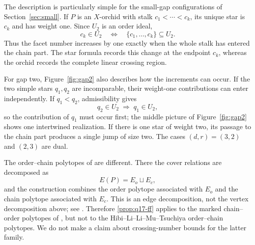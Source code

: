 \documentclass[a4paper, 11pt]{amsart}
\theoremstyle{definition}
\theoremstyle{remark}
\begin{document}
The description is particularly simple for the small-gap configurations of Section~\ref{sec:small}. If $P$ is an $X$-orchid with stalk $c_1<\cdots<c_k$, its unique star is $c_k$ and has weight one. Since $U_2$ is an order ideal,
\[
  c_k\in U_2
  \quad\Longleftrightarrow\quad
  \{c_1,\ldots,c_k\}\subseteq U_2.
\]
Thus the facet number increases by one exactly when the whole stalk has entered the chain part. The star formula records this change at the endpoint $c_k$, whereas the orchid records the complete linear crossing region.

For gap two, Figure~\ref{fig:gap2} also describes how the increments can occur. If the two simple stars $q_1,q_2$ are incomparable, their weight-one contributions can enter independently. If $q_1<q_2$, admissibility gives
\[
  q_2\in U_2\;\Longrightarrow\;q_1\in U_2,
\]
so the contribution of $q_1$ must occur first; the middle picture of Figure~\ref{fig:gap2} shows one intertwined realization. If there is one star of weight two, its passage to the chain part produces a single jump of size two. The cases $(d,r)=(3,2)$ and $(2,3)$ are dual.

The order--chain polytopes of \cite{HibiEtAl2019} are different. There the cover relations are decomposed as
\[
 E(P)=E_o\sqcup E_c,
\]
and the construction combines the order polytope associated with $E_o$ and the chain polytope associated with $E_c$. This is an edge decomposition, not the vertex decomposition above; see \cite[Remark~1.9]{FangFourier2016}. Therefore \cref{prop:q17-ff} applies to the marked chain--order polytopes of \cite{FangFourier2016}, but not to the Hibi--Li--Li--Mu--Tsuchiya order--chain polytopes. We do not make a claim about crossing-number bounds for the latter family.

\printbibliography
\end{document}
